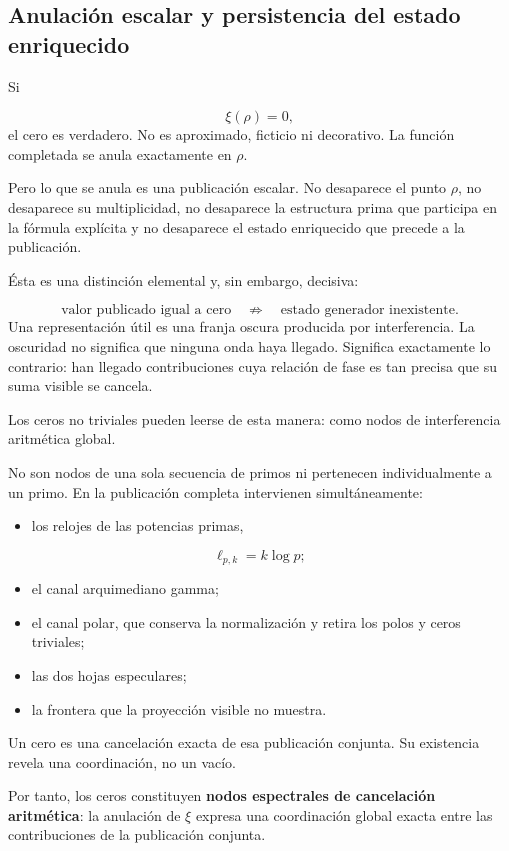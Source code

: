 \subsection{Anulación escalar y persistencia del estado enriquecido}
Si\par
\[
\xi(\rho)=0,
\]
el cero es verdadero. No es aproximado, ficticio ni decorativo. La función completada se anula exactamente en \(\rho\).\par
Pero lo que se anula es una publicación escalar. No desaparece el punto \(\rho\), no desaparece su multiplicidad, no desaparece la estructura prima que participa en la fórmula explícita y no desaparece el estado enriquecido que precede a la publicación.\par
Ésta es una distinción elemental y, sin embargo, decisiva:\par
\[
\text{valor publicado igual a cero}
\quad\not\Rightarrow\quad
\text{estado generador inexistente}.
\]
Una representación útil es una franja oscura producida por interferencia. La oscuridad no significa que ninguna onda haya llegado. Significa exactamente lo contrario: han llegado contribuciones cuya relación de fase es tan precisa que su suma visible se cancela.\par
Los ceros no triviales pueden leerse de esta manera: como nodos de interferencia aritmética global.\par
No son nodos de una sola secuencia de primos ni pertenecen individualmente a un primo. En la publicación completa intervienen simultáneamente:\par
\begin{itemize}
\item los relojes de las potencias primas,
\end{itemize}
\[
\ell_{p,k}=k\log p;
\]
\begin{itemize}
\item el canal arquimediano gamma;
\item el canal polar, que conserva la normalización y retira los polos y ceros triviales;
\item las dos hojas especulares;
\item la frontera que la proyección visible no muestra.
\end{itemize}
Un cero es una cancelación exacta de esa publicación conjunta. Su existencia revela una coordinación, no un vacío.\par
Por tanto, los ceros constituyen \textbf{nodos espectrales de cancelación aritmética}: la anulación de \(\xi\) expresa una coordinación global exacta entre las contribuciones de la publicación conjunta.\par
{}
